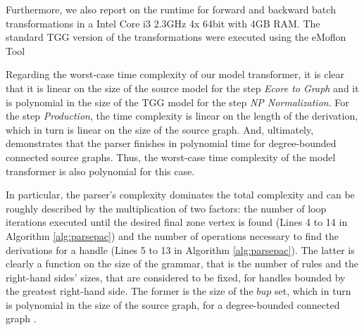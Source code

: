 
Furthermore, we also report on the runtime for forward and backward batch transformations in a Intel Core i3 2.3GHz 4x 64bit with 4GB RAM. The standard TGG version of the transformations were executed using the eMoflon Tool %

Regarding the worst-case time complexity of our model transformer, it is clear that it is linear on the size of the source model for the step \emph{Ecore to Graph} and it is polynomial in the size of the TGG model for the step \emph{NP Normalization}. For the step \emph{Production}, the time complexity is linear on the length of the derivation, which in turn is linear on the size of the source graph. And, ultimately, \cite[p. 160]{rozenberg1986boundary} demonstrates that the parser finishes in polynomial time for degree-bounded connected source graphs. Thus, the worst-case time complexity of the model transformer is also polynomial for this case.

In particular, the parser's complexity dominates the total complexity and can be roughly described by the multiplication of two factors: the number of loop iterations executed until the desired final zone vertex is found (Lines 4 to 14 in Algorithm \ref{alg:parsepac}) and the number of operations necessary to find the derivations for a handle (Lines 5 to 13 in Algorithm \ref{alg:parsepac}). The latter is clearly a function on the size of the grammar, that is the number of rules and the right-hand sides' sizes, that are considered to be fixed, for handles bounded by the greatest right-hand side. The former is the size of the $bup$ set, which in turn is polynomial in the size of the source graph, for a degree-bounded connected graph \cite[p. 161]{rozenberg1986boundary}.



